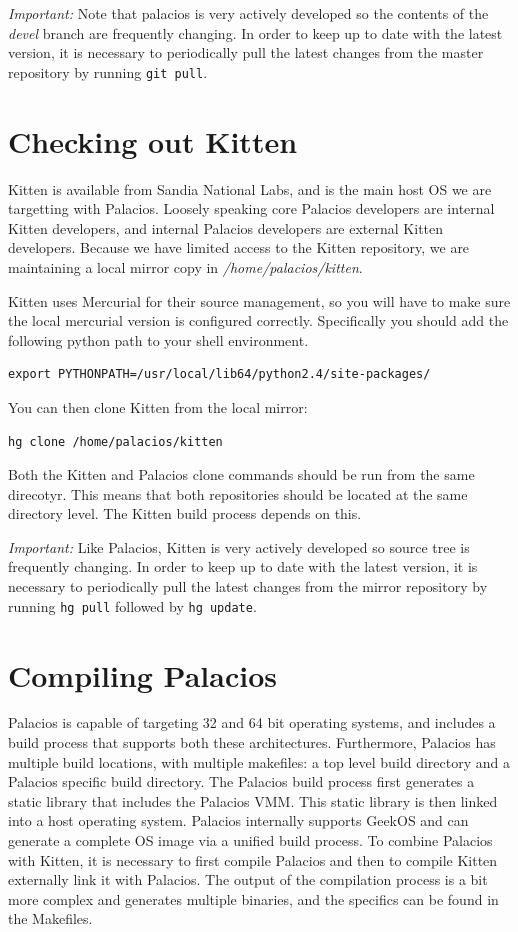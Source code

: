 \documentclass[11pt]{article}
\begin{document}
{\em Important:}
Note that palacios is very actively developed so the contents of the
{\em devel} branch are frequently changing. In order to keep up to
date with the latest version, it is necessary to periodically pull the
latest changes from the master repository by running \verb.git pull..



\section{Checking out Kitten}

Kitten is available from Sandia National Labs, and is the main host OS
we are targetting with Palacios. Loosely speaking core Palacios
developers are internal Kitten developers, and internal Palacios
developers are external Kitten developers. Because we have limited
access to the Kitten repository, we are maintaining a local mirror
copy in {\em /home/palacios/kitten}. 

Kitten uses Mercurial for their source management, so you will have to
make sure the local mercurial version is configured correctly.
Specifically you should add the following python path to your shell environment.

\begin{verbatim}
export PYTHONPATH=/usr/local/lib64/python2.4/site-packages/
\end{verbatim}

You can then clone Kitten from the local mirror:
\begin{verbatim}
hg clone /home/palacios/kitten
\end{verbatim}

Both the Kitten and Palacios clone commands should be run from the
same direcotyr. This means that both repositories should be located at
the same directory level. The Kitten build process depends on this.

{\em Important:} Like Palacios, Kitten is very actively developed so
source tree is frequently changing. In order to keep up to date with
the latest version, it is necessary to periodically pull the latest
changes from the mirror repository by running \verb.hg pull. followed
by \verb.hg update..

\section{Compiling Palacios}
Palacios is capable of targeting 32 and 64 bit operating systems, and
includes a build process that supports both these
architectures. Furthermore, Palacios has multiple build locations,
with multiple makefiles: a top level build directory and a Palacios
specific build directory. The Palacios build process first generates a
static library that includes the Palacios VMM. This static library is
then linked into a host operating system. Palacios internally supports
GeekOS and can generate a complete OS image via a unified build
process. To combine Palacios with Kitten, it is necessary to first
compile Palacios and then to compile Kitten externally link it with
Palacios. The output of the compilation process is a bit more complex
and generates multiple binaries, and the specifics can be found in the
Makefiles.
\end{document}
